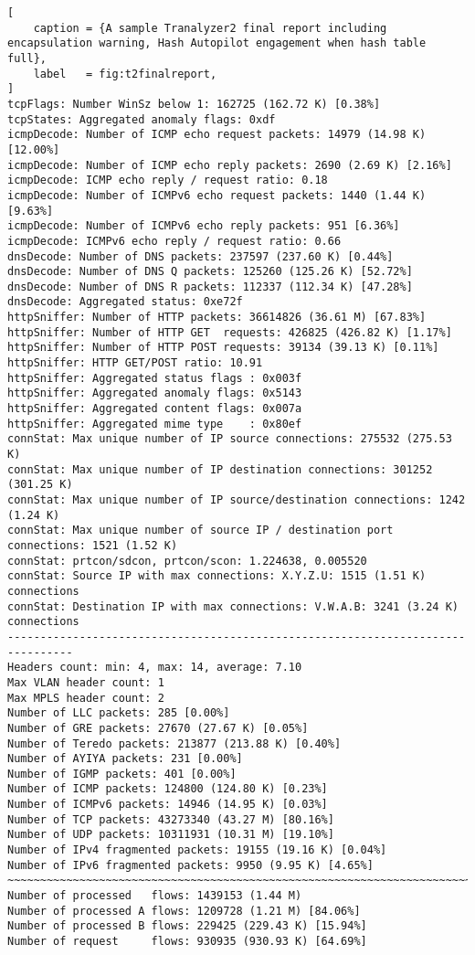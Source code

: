 \begin{lstlisting}[
    caption = {A sample Tranalyzer2 final report including encapsulation warning, Hash Autopilot engagement when hash table full},
    label   = fig:t2finalreport,
]
tcpFlags: Number WinSz below 1: 162725 (162.72 K) [0.38%]
tcpStates: Aggregated anomaly flags: 0xdf
icmpDecode: Number of ICMP echo request packets: 14979 (14.98 K) [12.00%]
icmpDecode: Number of ICMP echo reply packets: 2690 (2.69 K) [2.16%]
icmpDecode: ICMP echo reply / request ratio: 0.18
icmpDecode: Number of ICMPv6 echo request packets: 1440 (1.44 K) [9.63%]
icmpDecode: Number of ICMPv6 echo reply packets: 951 [6.36%]
icmpDecode: ICMPv6 echo reply / request ratio: 0.66
dnsDecode: Number of DNS packets: 237597 (237.60 K) [0.44%]
dnsDecode: Number of DNS Q packets: 125260 (125.26 K) [52.72%]
dnsDecode: Number of DNS R packets: 112337 (112.34 K) [47.28%]
dnsDecode: Aggregated status: 0xe72f
httpSniffer: Number of HTTP packets: 36614826 (36.61 M) [67.83%]
httpSniffer: Number of HTTP GET  requests: 426825 (426.82 K) [1.17%]
httpSniffer: Number of HTTP POST requests: 39134 (39.13 K) [0.11%]
httpSniffer: HTTP GET/POST ratio: 10.91
httpSniffer: Aggregated status flags : 0x003f
httpSniffer: Aggregated anomaly flags: 0x5143
httpSniffer: Aggregated content flags: 0x007a
httpSniffer: Aggregated mime type    : 0x80ef
connStat: Max unique number of IP source connections: 275532 (275.53 K)
connStat: Max unique number of IP destination connections: 301252 (301.25 K)
connStat: Max unique number of IP source/destination connections: 1242 (1.24 K)
connStat: Max unique number of source IP / destination port connections: 1521 (1.52 K)
connStat: prtcon/sdcon, prtcon/scon: 1.224638, 0.005520
connStat: Source IP with max connections: X.Y.Z.U: 1515 (1.51 K) connections
connStat: Destination IP with max connections: V.W.A.B: 3241 (3.24 K) connections
--------------------------------------------------------------------------------
Headers count: min: 4, max: 14, average: 7.10
Max VLAN header count: 1
Max MPLS header count: 2
Number of LLC packets: 285 [0.00%]
Number of GRE packets: 27670 (27.67 K) [0.05%]
Number of Teredo packets: 213877 (213.88 K) [0.40%]
Number of AYIYA packets: 231 [0.00%]
Number of IGMP packets: 401 [0.00%]
Number of ICMP packets: 124800 (124.80 K) [0.23%]
Number of ICMPv6 packets: 14946 (14.95 K) [0.03%]
Number of TCP packets: 43273340 (43.27 M) [80.16%]
Number of UDP packets: 10311931 (10.31 M) [19.10%]
Number of IPv4 fragmented packets: 19155 (19.16 K) [0.04%]
Number of IPv6 fragmented packets: 9950 (9.95 K) [4.65%]
~~~~~~~~~~~~~~~~~~~~~~~~~~~~~~~~~~~~~~~~~~~~~~~~~~~~~~~~~~~~~~~~~~~~~~~~~~~~~~~~
Number of processed   flows: 1439153 (1.44 M)
Number of processed A flows: 1209728 (1.21 M) [84.06%]
Number of processed B flows: 229425 (229.43 K) [15.94%]
Number of request     flows: 930935 (930.93 K) [64.69%]

\end{lstlisting}
